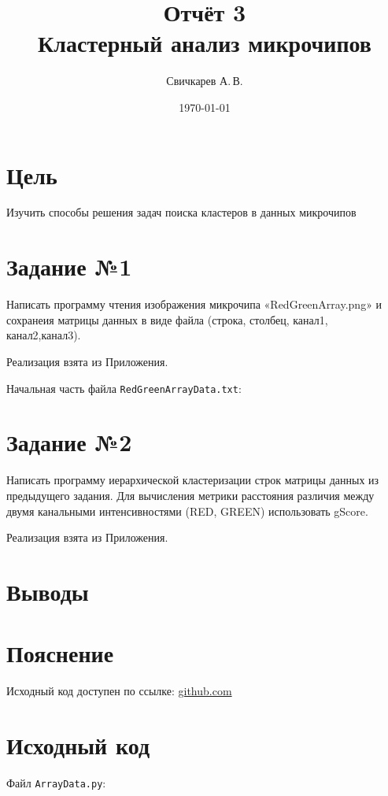 \documentclass{article} %
\title{Отчёт 3\protect\\Кластерный анализ микрочипов} %
\author{Свичкарев А.\,В.} %
\date{\today} %
\begin{document}

\maketitle %

\section{Цель}
Изучить способы решения задач
поиска кластеров в данных микрочипов

\section{Задание №1}
Написать программу чтения
изображения микрочипа «RedGreenArray.png» и
сохранеия матрицы данных в виде файла
(строка, столбец, канал1, канал2,канал3).

Реализация взята из Приложения.

Начальная часть файла \verb$RedGreenArrayData.txt$:


\clearpage
\section{Задание №2}
Написать программу иерархической кластеризации
строк матрицы данных из предыдущего задания.
Для вычисления метрики расстояния различия
между двумя канальными интенсивностями
(RED, GREEN) использовать gScore.

Реализация взята из Приложения.

\section{Выводы}



\section{Пояснение}
Исходный код доступен по ссылке:
\href{https://github.com/SvichkarevAnatoly/Course-Python-Bioinformatics/tree/master/semester2/task3}
{github.com}

\section{Исходный код}
Файл \verb$ArrayData.py$:

\end{document}
